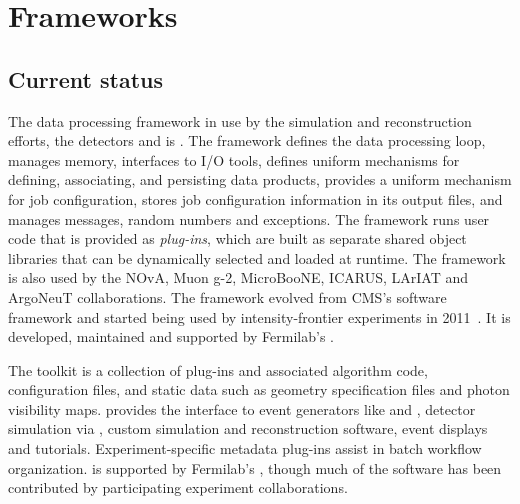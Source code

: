 \documentclass[../main-00.tex]{subfiles}
\begin{document}
\chapter{Frameworks }
\label{ch:fworks}

\section{Current status }

The data processing framework in use by the  simulation and reconstruction efforts, the  detectors and  is .  The  framework defines the data processing loop, manages memory, interfaces to I/O tools, defines uniform mechanisms for defining, associating, and persisting data products, provides a uniform mechanism for job configuration, stores job configuration information in its output files, and manages messages, random numbers and exceptions.  The  framework runs user code that is provided as {\it plug-ins}, which are built as separate shared object libraries that can be dynamically selected and loaded at runtime.  The  framework is also used by the NOvA, Muon g-2, MicroBooNE, ICARUS, LArIAT and ArgoNeuT collaborations.  The  framework evolved from CMS's software framework and started being used by intensity-frontier experiments in 2011~\cite{Green:2012gv}. It is developed, maintained and supported by Fermilab's .

The  toolkit is a collection of  plug-ins and associated algorithm code, configuration files, and static data such as geometry specification files and photon visibility maps.   provides the interface to event generators like  and , detector simulation via , custom simulation and reconstruction software, event displays and tutorials.  Experiment-specific metadata plug-ins assist in batch workflow organization.   is supported by Fermilab's , though much of the software has been contributed by participating experiment collaborations.
\end{document}
